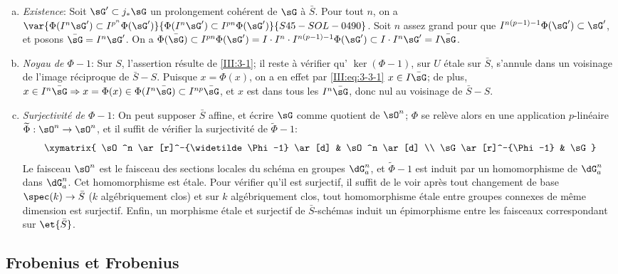 \begin{enumerate}[a)]
  \item \emph{Existence}: Soit $\sG'\subset j_*\sG$ un prolongement cohérent 
    de $\sG$ à $\bar S$. Pour tout $n$, on a 
    $\var{\Phi(I^n \sG')\subset I^{p^n}\Phi(\sG')}{\Phi(I^n \sG')\subset I^{p n}\Phi(\sG')}{S45-SOL-0490}$. Soit $n$ assez grand pour 
    que $I^{n(p-1)-1}\Phi(\sG')\subset \sG'$, et posons $\bar\sG=I^n\sG'$. 
    On a $\Phi(\bar\sG)\subset I^{p n}\Phi(\sG') 
    =I\cdot I^n\cdot I^{n(p-1)-1}\Phi(\sG')\subset I\cdot I^n\sG' 
    = I\bar\sG$. 
  \item {}\emph{Noyau de $\Phi-1$}: Sur $S$, l'assertion résulte de 
    \ref{III:3-1}; il reste à vérifier qu' 
    $\ker(\Phi-1)$, sur $U$ étale sur $\bar S$, s'annule dans un voisinage de 
    l'image réciproque de $\bar S-S$. Puisque $x=\Phi(x)$, on a en 
    effet par \eqref{III:eq:3-3-1} $x\in I\bar\sG$; de plus, 
    $x\in I^n\bar\sG\Rightarrow x=\Phi(x)\in\Phi(I^n\bar\sG)\subset I^{n p}\bar\sG$, et $x$ est dans tous les $I^n\bar\sG$, donc nul au voisinage de 
    $\bar S-S$.
  \item \emph{Surjectivité de $\Phi-1$}: On peut supposer $\bar S$ affine, et 
    écrire $\sG$ comme quotient de $\sO^n$; $\Phi$ se relève alors en une 
    application $p$-linéaire $\widetilde\Phi:\sO^n\to\sO^n$, et il suffit de 
    vérifier la surjectivité de $\widetilde\Phi-1$:
    \[\xymatrix{
      \sO^n \ar[r]^-{\widetilde \Phi-1} \ar[d] 
        & \sO^n \ar[d] \\
      \sG \ar[r]^-{\Phi-1} 
        & \sG 
    }\]
    Le faisceau $\sO^n$ est le faisceau des sections locales du schéma en 
    groupes $\dG_a^n$, et $\widetilde\Phi-1$ est induit par un homomorphisme de 
    $\dG_a^n$ dans $\dG_a^n$. Cet homomorphisme est étale. Pour vérifier 
    qu'il est surjectif, il suffit de le voir après tout changement de base 
    $\spec(k)\to\bar S$ ($k$ algébriquement clos) et sur $k$ algébriquement 
    clos, tout homomorphisme étale entre groupes connexes de même dimension 
    est surjectif. Enfin, un morphisme étale et surjectif de 
    $\bar S$-schémas induit un épimorphisme entre les faisceaux 
    correspondant sur $\et{\bar S}$.
\end{enumerate}





\subsection{Frobenius et Frobenius}\label{III:3-4}

